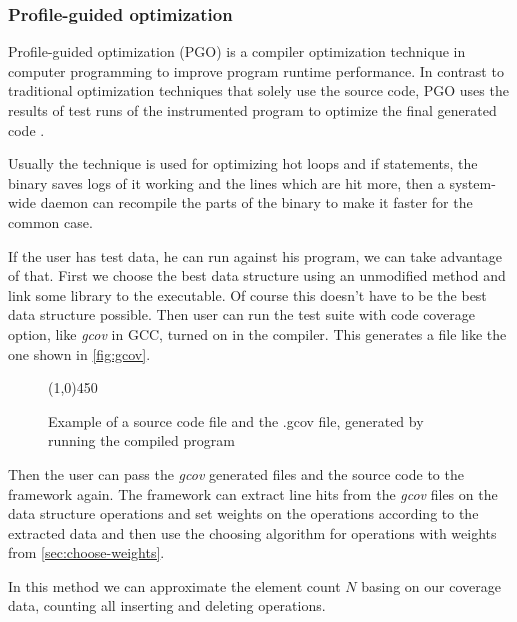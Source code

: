 \documentclass[a4paper,11pt]{article}
\begin{document}
		\subsubsection{Profile-guided optimization} \label{sec:pgo}

			Profile-guided optimization (PGO) is a compiler optimization technique in computer programming
			to improve program runtime performance.  In contrast to traditional optimization techniques that
			solely use the source code, PGO uses the results of test runs of the instrumented program to
            optimize the final generated code \cite{Wipgo}.

            Usually the technique is used for optimizing hot loops and if statements, the binary saves logs of it
            working and the lines which are hit more, then a system-wide daemon can recompile the parts of the binary to
            make it faster for the common case.

			If the user has test data, he can run against his program, we can take advantage of that.  First
			we choose the best data structure using an unmodified method and link some library to the
			executable. Of course this doesn't have to be the best data structure possible. Then user can run the test
			suite with code coverage option, like \emph{gcov} in GCC, turned on in the compiler. This
			generates a file like the one shown in \autoref{fig:gcov}.

			\begin{figure} \label{fig:gcov}
				

				\centering \line(1,0){450}

				

				\caption{Example of a source code file and the .gcov file, generated by running the
				compiled program}

				\label{fig:gcov}
			\end{figure}


			Then the user can pass the \emph{gcov} generated files and the source code to the framework
			again. The framework can extract line hits from the \emph{gcov} files on the data structure
			operations and set weights on the operations according to the extracted data and then use the
			choosing algorithm for operations with weights from \autoref{sec:choose-weights}.

            In this method we can approximate the element count $N$ basing on our coverage data, counting all inserting
            and deleting operations.
\end{document}
